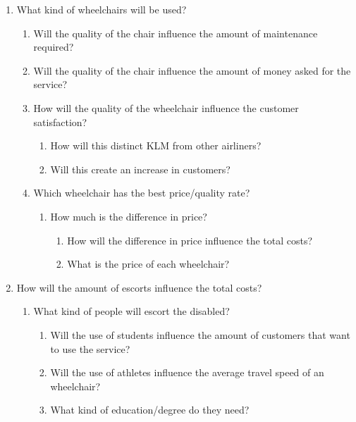 \documentclass[a4paper, 12pt, notitlepage]{report}
\begin{document}
\begin{enumerate}
\begin{enumerate}
	\end{enumerate}
\item What kind of wheelchairs will be used?
	\begin{enumerate}
	\item Will the quality of the chair influence the amount of maintenance required?
	\item Will the quality of the chair influence the amount of money asked for the service?
	\item How will the quality of the wheelchair influence the customer satisfaction?
		\begin{enumerate}
		\item How will this distinct KLM from other airliners?
		\item Will this create an increase in customers?
		\end{enumerate}
	\item Which wheelchair has the best price/quality rate?
		\begin{enumerate}
		\item How much is the difference in price?
			\begin{enumerate}
			\item How will the difference in price influence the total costs?
			\item What is the price of each wheelchair?
			\end{enumerate}
		\end{enumerate}
	\end{enumerate}
\item How will the amount of escorts influence the total costs?
	\begin{enumerate}
	\item What kind of people will escort the disabled?
		\begin{enumerate}
		\item Will the use of students influence the amount of customers that want to use the service?
		\item Will the use of athletes influence the average travel speed of an wheelchair?
		\item What kind of education/degree do they need?


\end{enumerate}
\end{enumerate}
\end{enumerate}
\end{document}
